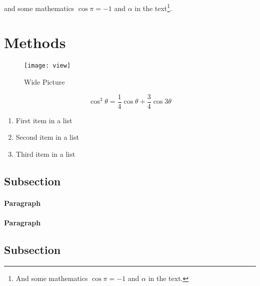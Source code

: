 \documentclass[fleqn,10pt]{SelfArx} %
\begin{document}
 and some mathematics $\cos\pi=-1$ and $\alpha$ in the text\footnote{And some mathematics $\cos\pi=-1$ and $\alpha$ in the text.}.



\section{Methods}

\begin{figure*}[ht]\centering %
\texttt{[image: view]}
\caption{Wide Picture}
\label{fig:view}
\end{figure*}

\lipsum[4] %

\begin{equation}
\cos^3 \theta =\frac{1}{4}\cos\theta+\frac{3}{4}\cos 3\theta
\label{eq:refname2}
\end{equation}

\lipsum[5] %

\begin{enumerate}[noitemsep] %
\item First item in a list
\item Second item in a list
\item Third item in a list
\end{enumerate}

\subsection{Subsection}

\lipsum[6] %

\paragraph{Paragraph} \lipsum[7] %
\paragraph{Paragraph} \lipsum[8] %

\subsection{Subsection}
\end{document}
